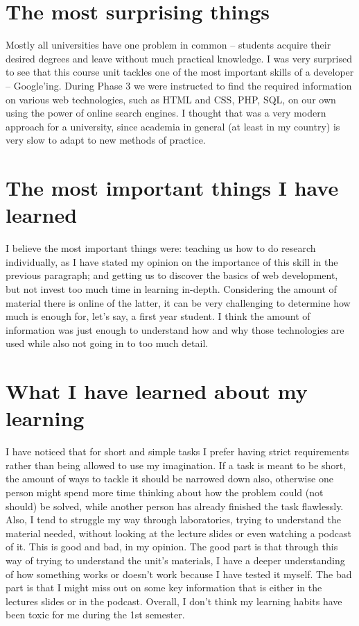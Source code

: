 \documentclass[a4paper]{article}
\begin{document}
\section*{The most surprising things}
Mostly all universities have one problem in common – students acquire their desired degrees and leave without much practical knowledge. I was very surprised to see that this course unit tackles one of the most important skills of a developer – Google’ing. During Phase 3 we were instructed to find the required information on various web technologies, such as HTML and CSS, PHP, SQL, on our own using the power of online search engines. I thought that was a very modern approach for a university, since academia in general (at least in my country) is very slow to adapt to new methods of practice.
\section*{The most important things I have learned}
I believe the most important things were: teaching us how to do research individually, as I have stated my opinion on the importance of this skill in the previous paragraph; and getting us to discover the basics of web development, but not invest too much time in learning in-depth. Considering the amount of material there is online of the latter, it can be very challenging to determine how much is enough for, let’s say, a first year student. I think the amount of information was just enough to understand how and why those technologies are used while also not going in to too much detail.
\section*{What I have learned about my learning}
I have noticed that for short and simple tasks I prefer having strict requirements rather than being allowed to use my imagination. If a task is meant to be short, the amount of ways to tackle it should be narrowed down also, otherwise one person might spend more time thinking about how the problem could (not should) be solved, while another person has already finished the task flawlessly. Also, I tend to struggle my way through laboratories, trying to understand the material needed, without looking at the lecture slides or even watching a podcast of it. This is good and bad, in my opinion. The good part is that through this way of trying to understand the unit’s materials, I have a deeper understanding of how something works or doesn’t work because I have tested it myself. The bad part is that I might miss out on some key information that is either in the lectures slides or in the podcast. Overall,  I don’t think my learning habits have been toxic for me during the 1st semester.
\end{document}

